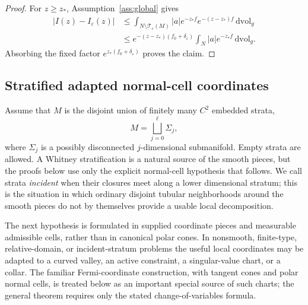 \documentclass[11pt]{amsart}
\numberwithin{equation}{section}
\theoremstyle{definition}
\theoremstyle{remark}
\newcommand{\dvol}{\,\mathrm{dvol}}
\newcommand{\eps}{\varepsilon}
\newcommand{\cT}{\mathcal{T}}
\begin{document}
\begin{proof}
For $z\ge z_*$, Assumption~\ref{ass:global} gives
\begin{align*}
 |I(z)-I_\eps(z)|
 &\le \int_{N\setminus\cT_\eps(M)}
       |a|e^{-z_*f}e^{-(z-z_*)f}\dvol_g \\
 &\le e^{-(z-z_*)(f_0+\delta_\eps)}
       \int_N|a|e^{-z_*f}\dvol_g.
\end{align*}
Absorbing the fixed factor $e^{z_*(f_0+\delta_\eps)}$ proves the claim.
\end{proof}


\subsection{Stratified adapted normal-cell coordinates}

Assume that $M$ is the disjoint union of finitely many $C^2$ embedded strata,
\begin{equation}\label{eq:stratification}
  M=\bigsqcup_{j=0}^{\ell}\Sigma_j,
\end{equation}
where $\Sigma_j$ is a possibly disconnected $j$-dimensional submanifold.  Empty
strata are allowed.  A Whitney stratification is a natural source of the smooth
pieces, but the proofs below use only the explicit normal-cell hypothesis that
follows.  We call strata \emph{incident} when their closures meet along a lower
dimensional stratum; this is the situation in which ordinary disjoint tubular
neighborhoods around the smooth pieces do not by themselves provide a usable
local decomposition.

The next hypothesis is formulated in supplied coordinate pieces and measurable
admissible cells, rather than in canonical polar cones.  In nonsmooth,
finite-type, relative-domain, or incident-stratum problems the useful local
coordinates may be adapted to a curved valley, an active constraint, a
singular-value chart, or a collar.  The familiar Fermi-coordinate construction,
with tangent cones and polar normal cells, is treated below as an important
special source of such charts; the general theorem requires only the stated
change-of-variables formula.
\end{document}
